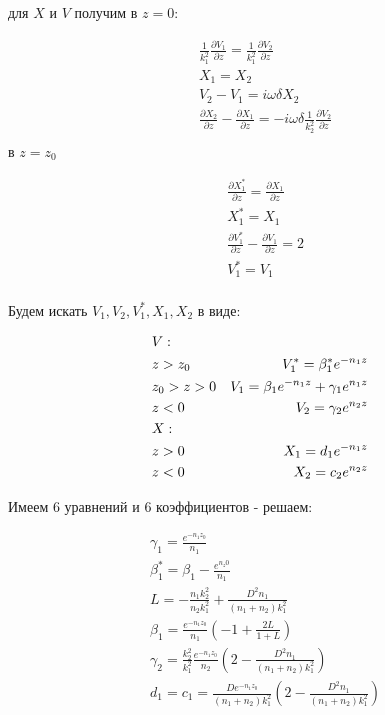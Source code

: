 	для $X$ и $V$ получим в $z = 0$:
	
	\begin{equation}
		\begin{aligned}
			& \frac{1}{k_1^2} \frac{\partial V_1}{\partial z} = \frac{1}{k_1^2} \frac{\partial V_2}{\partial z} \\
			&X_1 = X_2 \\
			& V_2 - V_1 = i \omega \delta X_2 \\
			&\frac{\partial X_2}{\partial z} - \frac{\partial X_1}{\partial z} = -i \omega \delta \frac{1}{k_2^2} \frac{\partial V_2}{\partial z} \\ 
		\end{aligned}
	\end{equation}
	\newpage
	в $z = z_0$
	
	
	\begin{equation}
		\begin{aligned}
			&\frac{\partial X_1^*}{\partial z} = \frac{\partial X_1}{\partial z} \\
			&X_1^* = X_1 \\
			&\frac{\partial V_1^*}{\partial z} - \frac{\partial V_1}{\partial z} = 2 \\
			&V_1^* = V_1 \\
		\end{aligned}
	\end{equation}
	
	Будем искать $V_1, V_2, V_1^*, X_1, X_2$ в виде:
	
	\begin{equation}
		\begin{aligned}
			&V: \\
			& z > z_0 \space 	&V_1^* = \beta_1^* e^{-n_1z} \\
			& z_0 > z > 0 \space	 &V_1 = \beta_1 e^{-n_1z} + \gamma_1 e^{n_1z} \\
			& z < 0 \space	&V_2 =  \gamma_2 e^{n_2z} \\
			&X: \\
			& z > 0 \space	&X_1 = d_1 e^{-n_1z} \\
			& z < 0	\space	&X_2 = c_2 e^{n_2z} 
		\end{aligned}
	\end{equation}

	Имеем 6 уравнений и 6 коэффициентов - решаем:

	\begin{equation}
		\begin{aligned}
			&\gamma_1 = \frac{e^{-n_1z_0}}{n_1} \\
			&\beta_1^* = \beta_1 - \frac{e^{n_z0}}{n_1} \\
			&L = -\frac{n_1 k_2^2}{n_2 k_1^2} + \frac{D^2 n_1}{(n_1 + n_2)k_1^2} \\
			&\beta_1 = \frac{e^{-n_1 z_0}}{n_1} (-1 + \frac{2L}{1 + L}) \\
			&\gamma_2 = \frac{k_2^2}{k_1^2} \frac{e^{-n_1z_0}}{n_2}(2 - \frac{D^2 n_1}{(n_1 + n_2)k_1^2}) \\
			&d_1 = c_1 = \frac{D e^{-n_1 z_0}}{(n_1 + n_2) k_1^2}(2 - \frac{D^2 n_1}{(n_1 + n_2)k_1^2}) \\ 
		\end{aligned}
	\end{equation}
	
